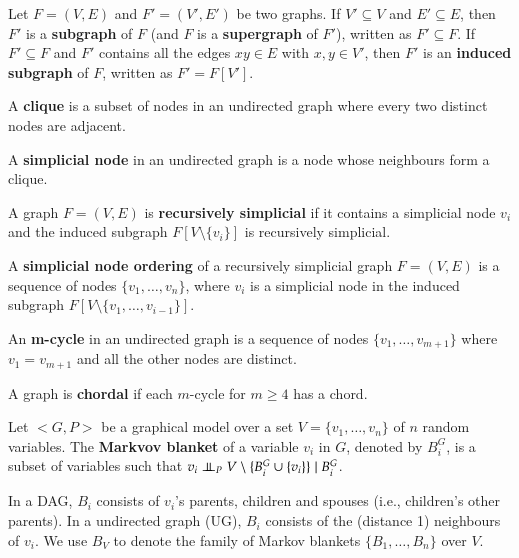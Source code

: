 \begin{definition}
\label{def:subgraph}
Let $F=(V,E)$ and $F'=(V',E')$ be two graphs. If $V' \subseteq V$ and $E' \subseteq E$, then $F'$ is a \textbf{subgraph} of $F$ (and $F$ is a \textbf{supergraph} of $F'$), written as $F' \subseteq F$. If $F' \subseteq F$ and $F'$ contains all the edges $xy \in E$ with $x, y \in V'$, then $F'$ is an \textbf{induced subgraph} of $F$, written as $F' = F[V']$. 
\end{definition}

\begin{definition}
A \textbf{clique} is a subset of nodes in an undirected graph where every two distinct nodes are adjacent. 
\end{definition}

\begin{definition}
A \textbf{simplicial node} in an undirected graph is a node whose neighbours form a clique. 
\end{definition}

\begin{definition}
A graph $F=(V,E)$ is \textbf{recursively simplicial} if it contains a simplicial node $v_i$ and the induced subgraph $F[V\setminus \{v_{i}\}]$ is recursively simplicial. 
\end{definition}

\begin{definition}
A \textbf{simplicial node ordering} of a recursively simplicial graph $F=(V,E)$ is a sequence of nodes $\{v_1, \dots, v_n\}$, where $v_i$ is a simplicial node in the induced subgraph $F[V\setminus \{v_1,\dots, v_{i-1}\}]$.
\end{definition}

\begin{definition}
An \textbf{m-cycle} in an undirected graph is a sequence of nodes $\{v_1, \dots, v_{m+1}\}$ where $v_1 = v_{m+1}$ and all the other nodes are distinct.  
\end{definition}

\begin{definition}
A graph is \textbf{chordal} if each $m$-cycle for $m \ge 4$ has a chord.
\end{definition}

\begin{definition} 
\label{def:mb}
Let $<G, P>$ be a graphical model over a set $V = \{v_1, \dots, v_n\}$ of $n$ random variables. The \textbf{Markvov blanket} of a variable $v_i$ in $G$, denoted by $B_i^G$, is a subset of variables such that $v_i \ci_{P} V\setminus \{B_i^G \cup \{v_i\}\} \mid B_i^G$.
\end{definition}
In a DAG, $B_i$ consists of $v_i$'s parents, children and spouses (i.e., children's other parents). In a undirected graph (UG), $B_i$ consists of the (distance 1) neighbours of $v_i$. We use $B_V$ to denote the family of Markov blankets $\{B_1, \dots, B_n\}$ over $V$.

